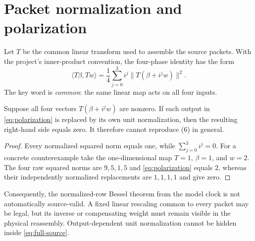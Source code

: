 \section{Packet normalization and polarization}

Let $T$ be the common linear transform used to assemble the source packets.  With the
project's inner-product convention, the four-phase identity has the form
\begin{equation}
 \langle T\beta,Tw\rangle
 =\frac14\sum_{j=0}^3 i^j\|T(\beta+i^jw)\|^2.          \label{eq:polarization}
\end{equation}
The key word is \emph{common}: the same linear map acts on all four inputs.

\begin{proposition}
Suppose all four vectors $T(\beta+i^jw)$ are nonzero.  If each output in
\eqref{eq:polarization} is
replaced by its own unit normalization, then the resulting right-hand side equals
zero.  It therefore cannot reproduce (6) in general.
\end{proposition}

\begin{proof}
Every normalized squared norm equals one, while
$\sum_{j=0}^3i^j=0$.  For a concrete counterexample take the one-dimensional map
$T=1$, $\beta=1$, and $w=2$.  The four raw squared norms are $9,5,1,5$ and \eqref{eq:polarization} equals
$2$, whereas their independently normalized replacements are $1,1,1,1$ and give
zero.
\end{proof}

Consequently, the normalized-row Bessel theorem from the model clock is not
automatically source-valid.  A fixed linear rescaling common to every packet may be
legal, but its inverse or compensating weight must remain visible in the physical
reassembly.  Output-dependent unit normalization cannot be hidden inside
\eqref{eq:full-source}.
